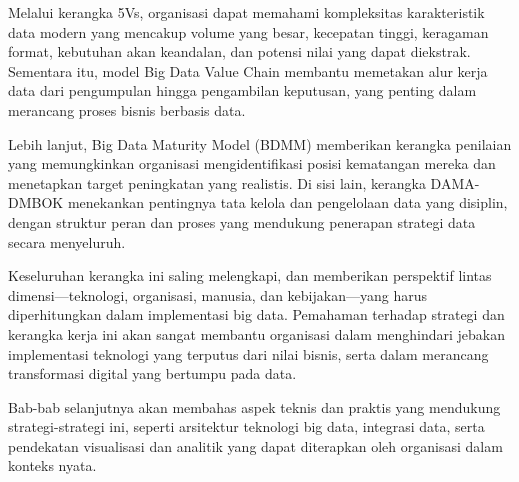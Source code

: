Melalui kerangka 5Vs, organisasi dapat memahami kompleksitas karakteristik data modern yang mencakup volume yang besar, kecepatan tinggi, keragaman format, kebutuhan akan keandalan, dan potensi nilai yang dapat diekstrak. Sementara itu, model Big Data Value Chain membantu memetakan alur kerja data dari pengumpulan hingga pengambilan keputusan, yang penting dalam merancang proses bisnis berbasis data.

Lebih lanjut, Big Data Maturity Model (BDMM) memberikan kerangka penilaian yang memungkinkan organisasi mengidentifikasi posisi kematangan mereka dan menetapkan target peningkatan yang realistis. Di sisi lain, kerangka DAMA-DMBOK menekankan pentingnya tata kelola dan pengelolaan data yang disiplin, dengan struktur peran dan proses yang mendukung penerapan strategi data secara menyeluruh.

Keseluruhan kerangka ini saling melengkapi, dan memberikan perspektif lintas dimensi—teknologi, organisasi, manusia, dan kebijakan—yang harus diperhitungkan dalam implementasi big data. Pemahaman terhadap strategi dan kerangka kerja ini akan sangat membantu organisasi dalam menghindari jebakan implementasi teknologi yang terputus dari nilai bisnis, serta dalam merancang transformasi digital yang bertumpu pada data.

Bab-bab selanjutnya akan membahas aspek teknis dan praktis yang mendukung strategi-strategi ini, seperti arsitektur teknologi big data, integrasi data, serta pendekatan visualisasi dan analitik yang dapat diterapkan oleh organisasi dalam konteks nyata.